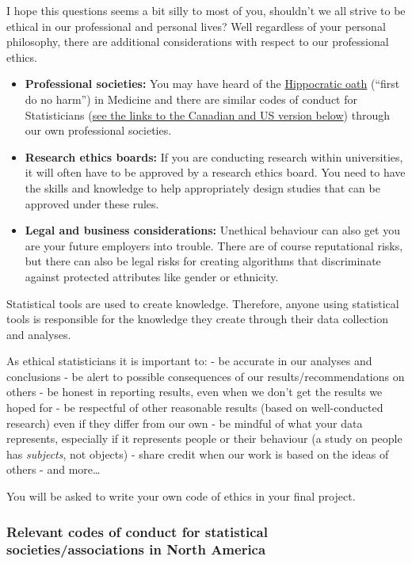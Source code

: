 \documentclass[
  openany]{book}
\begin{document}
I hope this questions seems a bit silly to most of you, shouldn't we all strive to be ethical in our professional and personal lives? Well regardless of your personal philosophy, there are additional considerations with respect to our professional ethics.

\begin{itemize}
\item
  \textbf{Professional societies:} You may have heard of the \href{https://en.wikipedia.org/wiki/Hippocratic_Oath}{Hippocratic oath} (``first do no harm'') in Medicine and there are similar codes of conduct for Statisticians (\protect\hyperlink{ethicscodes}{see the links to the Canadian and US version below}) through our own professional societies.
\item
  \textbf{Research ethics boards:} If you are conducting research within universities, it will often have to be approved by a research ethics board. You need to have the skills and knowledge to help appropriately design studies that can be approved under these rules.
\item
  \textbf{Legal and business considerations:} Unethical behaviour can also get you are your future employers into trouble. There are of course reputational risks, but there can also be legal risks for creating algorithms that discriminate against protected attributes like gender or ethnicity.
\end{itemize}

Statistical tools are used to create knowledge. Therefore, anyone using statistical tools is responsible for the knowledge they create through their data collection and analyses.

As ethical statisticians it is important to:
- be accurate in our analyses and conclusions
- be alert to possible consequences of our results/recommendations on others
- be honest in reporting results, even when we don't get the results we hoped for
- be respectful of other reasonable results (based on well-conducted research) even if they differ from our own
- be mindful of what your data represents, especially if it represents people or their behaviour (a study on people has \emph{subjects}, not objects)
- share credit when our work is based on the ideas of others
- and more\ldots{}

You will be asked to write your own code of ethics in your final project.

\hypertarget{ethicscodes}{%
\subsubsection{Relevant codes of conduct for statistical societies/associations in North America}\label{ethicscodes}}
\end{document}
